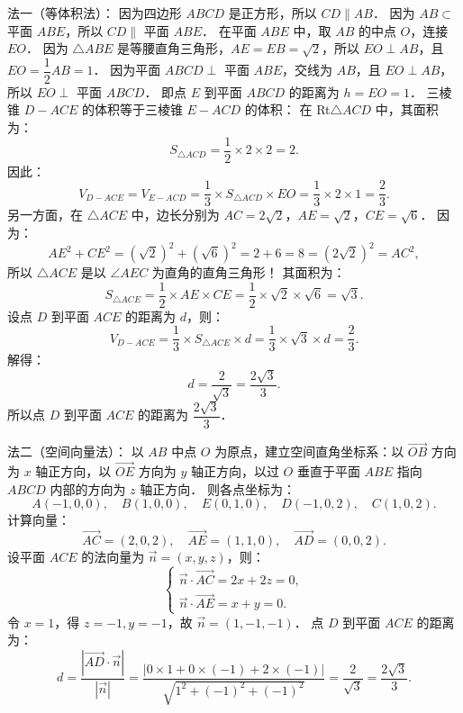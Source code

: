 \begin{answer}
法一（等体积法）：
因为四边形 $ABCD$ 是正方形，所以 $CD \parallel AB$．
因为 $AB \subset$ 平面 $ABE$，所以 $CD \parallel$ 平面 $ABE$．
在平面 $ABE$ 中，取 $AB$ 的中点 $O$，连接 $EO$．
因为 $\triangle ABE$ 是等腰直角三角形，$AE = EB = \sqrt{2}$，所以 $EO \perp AB$，且 $EO = \dfrac{1}{2} AB = 1$．
因为平面 $ABCD \perp$ 平面 $ABE$，交线为 $AB$，且 $EO \perp AB$，所以 $EO \perp$ 平面 $ABCD$．
即点 $E$ 到平面 $ABCD$ 的距离为 $h = EO = 1$．
三棱锥 $D - ACE$ 的体积等于三棱锥 $E - ACD$ 的体积：
在 Rt$\triangle ACD$ 中，其面积为：
\nopagebreak[4]
\[
S_{\triangle ACD} = \frac{1}{2} \times 2 \times 2 = 2.
\]
因此：
\nopagebreak[4]
\[
V_{D - ACE} = V_{E - ACD} = \frac{1}{3} \times S_{\triangle ACD} \times EO = \frac{1}{3} \times 2 \times 1 = \frac{2}{3}.
\]
另一方面，在 $\triangle ACE$ 中，边长分别为 $AC = 2\sqrt{2}$，$AE = \sqrt{2}$，$CE = \sqrt{6}$．
因为：
\nopagebreak[4]
\[
AE^2 + CE^2 = (\sqrt{2})^2 + (\sqrt{6})^2 = 2 + 6 = 8 = (2\sqrt{2})^2 = AC^2,
\]
所以 $\triangle ACE$ 是以 $\angle AEC$ 为直角的直角三角形！
其面积为：
\nopagebreak[4]
\[
S_{\triangle ACE} = \frac{1}{2} \times AE \times CE = \frac{1}{2} \times \sqrt{2} \times \sqrt{6} = \sqrt{3}.
\]
设点 $D$ 到平面 $ACE$ 的距离为 $d$，则：
\nopagebreak[4]
\[
V_{D - ACE} = \frac{1}{3} \times S_{\triangle ACE} \times d = \frac{1}{3} \times \sqrt{3} \times d = \frac{2}{3}.
\]
解得：
\nopagebreak[4]
\[
d = \frac{2}{\sqrt{3}} = \frac{2\sqrt{3}}{3}.
\]
所以点 $D$ 到平面 $ACE$ 的距离为 $\dfrac{2\sqrt{3}}{3}$．

法二（空间向量法）：
以 $AB$ 中点 $O$ 为原点，建立空间直角坐标系：以 $\overrightarrow{OB}$ 方向为 $x$ 轴正方向，以 $\overrightarrow{OE}$ 方向为 $y$ 轴正方向，以过 $O$ 垂直于平面 $ABE$ 指向 $ABCD$ 内部的方向为 $z$ 轴正方向．
则各点坐标为：
\nopagebreak[4]
\[
A(-1, 0, 0), \quad B(1, 0, 0), \quad E(0, 1, 0), \quad D(-1, 0, 2), \quad C(1, 0, 2).
\]
计算向量：
\nopagebreak[4]
\[
\overrightarrow{AC} = (2, 0, 2), \quad \overrightarrow{AE} = (1, 1, 0), \quad \overrightarrow{AD} = (0, 0, 2).
\]
设平面 $ACE$ 的法向量为 $\vec{n} = (x, y, z)$，则：
\nopagebreak[4]
\[
\begin{cases}
\vec{n} \cdot \overrightarrow{AC} = 2x + 2z = 0, \\
\vec{n} \cdot \overrightarrow{AE} = x + y = 0.
\end{cases}
\]
令 $x = 1$，得 $z = -1, y = -1$，故 $\vec{n} = (1, -1, -1)$．
点 $D$ 到平面 $ACE$ 的距离为：
\nopagebreak[4]
\[
d = \frac{|\overrightarrow{AD} \cdot \vec{n}|}{|\vec{n}|} = \frac{|0 \times 1 + 0 \times (-1) + 2 \times (-1)|}{\sqrt{1^2 + (-1)^2 + (-1)^2}} = \frac{2}{\sqrt{3}} = \frac{2\sqrt{3}}{3}.
\]




\end{answer}
